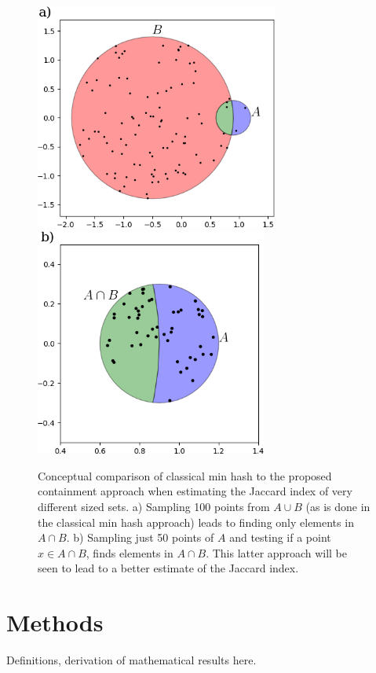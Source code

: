\documentclass[11pt]{amsart}
\theoremstyle{remark}
\numberwithin{equation}{section}
\begin{document}
\begin{figure}[!h]%
\begin{center}
\includegraphics[width=3.15in,trim={0 0 0 0in},clip]{Figs/ClassicalConceptual.png}%
\hspace{1ex}
\includegraphics[width=3.0in,trim={0 0 0 0in},clip]{Figs/ContainmentConceptual.png}
\end{center}
\caption{Conceptual comparison of classical min hash to the proposed containment approach when estimating the Jaccard index of very different sized sets. a) Sampling 100 points from $A\cup B$ (as is done in the classical min hash approach) leads to finding only \protect elements in $A\cap B$. b) Sampling just 50 points of $A$ and testing if a point $x\in A\cap B$, finds \protect elements in $A\cap B$. This latter approach will be seen to lead to a better estimate of the Jaccard index. }
\label{fig:Conceptual}%
\end{figure}





\section{Methods}
Definitions, derivation of mathematical results here.
\end{document}
